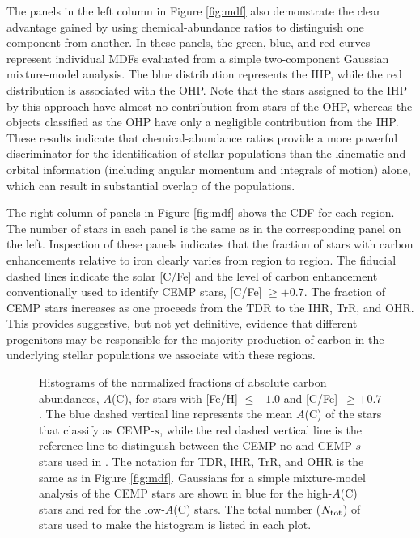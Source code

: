 \documentclass[iop]{emulateapj}
\newcommand*{\cfe}{[C/Fe]}
\begin{document}
The panels in the left column in Figure \ref{fig:mdf} also demonstrate the
clear advantage gained by using chemical-abundance ratios to distinguish one
component from another. In these panels, the green, blue, and red curves
represent individual MDFs evaluated from a simple two-component Gaussian
mixture-model analysis. The blue distribution represents the IHP, while
the red distribution is associated with the OHP.
Note that the stars assigned to the IHP by this approach have almost no
contribution from stars of the OHP, whereas the objects classified as the OHP
have only a negligible contribution from the IHP. These results indicate that
chemical-abundance ratios provide a more powerful discriminator for the
identification of stellar populations than the kinematic and orbital
information (including angular momentum and integrals of motion) alone, which
can result in substantial overlap of the populations.

The right column of panels in Figure \ref{fig:mdf} shows the CDF for
each region. The number of stars in each panel is the same as in the
corresponding panel on the left. Inspection of these panels indicates
that the fraction of stars with carbon enhancements relative to iron
clearly varies from region to region. The fiducial dashed lines indicate
the solar [C/Fe] and the level of carbon enhancement conventionally used
to identify CEMP stars, [C/Fe] $\ge +0.7$. The fraction of CEMP stars
increases as one proceeds from the TDR to the IHR, TrR, and OHR. This
provides suggestive, but not yet definitive, evidence that different
progenitors may be responsible for the majority production of carbon in
the underlying stellar populations we associate with these regions.

\begin{figure}
\centering
{}
\caption{Histograms of the normalized fractions of absolute carbon abundances,
$A$(C), for stars with [Fe/H] $\le -1.0$ and \cfe\ $\geq +0.7$. The blue
dashed vertical line represents the mean $A$(C) of the stars that \citet{yoon2016}
classify as CEMP-$s$, while the red dashed vertical line is the reference line to
distinguish between the CEMP-no and CEMP-$s$ stars used in \citet{yoon2016}. The
notation for TDR, IHR, TrR, and OHR is the same as in Figure
\ref{fig:mdf}. Gaussians for a simple mixture-model analysis of the CEMP stars are
shown in blue for the high-$A$(C) stars and red for the low-$A$(C) stars. The
total number ($N_{\rm tot}$) of stars used to make the histogram
is listed in each plot.}
\label{fig:ac}
\end{figure}
\end{document}
